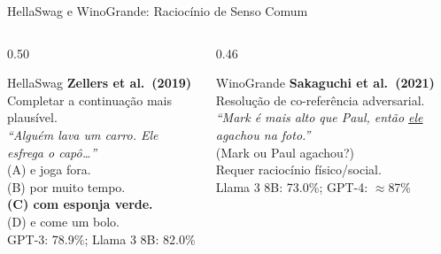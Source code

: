 \documentclass[aspectratio=169, xcolor=dvipsnames]{beamer}
\begin{document}
  \begin{frame}{HellaSwag e WinoGrande: Raciocínio de Senso Comum}
    \begin{columns}[T]
      \begin{column}{0.50\textwidth}
        \begin{block}{HellaSwag \cite{zellers2019hellaswag}}
          \textbf{Zellers et al.\ (2019)}\\
          Completar a continuação mais plausível.\\[0.2em]
          \textit{``Alguém lava um carro. Ele esfrega o capô\ldots''}\\
          (A) e joga fora.\\
          (B) por muito tempo.\\
          \textbf{(C) com esponja verde.}\\
          (D) e come um bolo.\\[0.3em]
          GPT-3: 78.9\%; Llama 3 8B: 82.0\%
        \end{block}
      \end{column}
      \begin{column}{0.46\textwidth}
        \begin{block}{WinoGrande}
          \textbf{Sakaguchi et al.\ (2021)}\\
          Resolução de co-referência adversarial.\\[0.2em]
          \textit{``Mark é mais alto que Paul, então \underline{ele} agachou na foto.''}\\
          (Mark ou Paul agachou?)\\[0.3em]
          Requer raciocínio físico/social.\\[0.3em]
          Llama 3 8B: 73.0\%; GPT-4: $\approx$87\%
        \end{block}
      \end{column}
    \end{columns}
  \end{frame}
\end{document}
